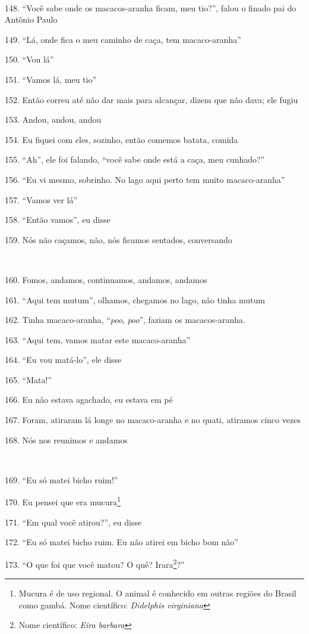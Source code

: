 ~

148. ``Você sabe onde os macacos-aranha ficam, meu tio?'', falou o finado pai do Antônio Paulo

149. ``Lá, onde fica o meu caminho de caça, tem macaco-aranha''

150. ``Vou lá''

151. ``Vamos lá, meu tio''

152. Então correu até não dar mais para alcançar, dizem que não dava; ele fugiu

153. Andou, andou, andou

154. Eu fiquei com eles, sozinho, então comemos batata, comida

155. ``Ah'', ele foi falando, ``você sabe onde está a caça, meu cunhado?''

156. ``Eu vi mesmo, sobrinho. No lago aqui perto tem muito macaco-aranha''

157. ``Vamos ver lá''

158. ``Então vamos'', eu disse

159. Nós não caçamos, não, nós ficamos sentados, conversando

~

160. Fomos, andamos, continuamos, andamos, andamos

161. ``Aqui tem mutum'', olhamos, chegamos no lago, não tinha mutum

162. Tinha macaco-aranha, ``\emph{poo}, \emph{poo}'', faziam os
macacos-aranha. 

163. ``Aqui tem, vamos matar este macaco-aranha''

164. ``Eu vou matá-lo'', ele disse

165. ``Mata!''

166. Eu não estava agachado, eu estava em pé

167. Foram, atiraram lá longe no macaco-aranha e no quati, atiramos cinco
vezes

168. Nós nos reunimos e andamos

~

169. ``Eu só matei bicho ruim!''

170. Eu pensei que era mucura\footnote{Mucura é de uso regional. O animal
  é conhecido em outras regiões do Brasil como gambá. Nome científico:
  \emph{Didelphis virginiana}}

171. ``Em qual você atirou?'', eu disse

172. ``Eu só matei bicho ruim. Eu não atirei em bicho bom não''

173. ``O que foi que você matou? O quê? Irara\footnote{Nome científico:
  \emph{Eira barbara}}?''

